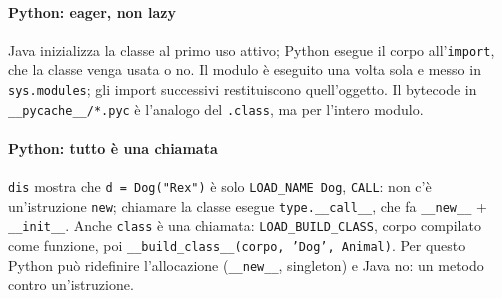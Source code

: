 \documentclass[a4paper,12pt]{article}
\begin{document}
\paragraph{Python: eager, non lazy} Java inizializza la classe al primo uso attivo; Python
esegue il corpo all'\texttt{import}, che la classe venga usata o no. Il modulo è eseguito una
volta sola e messo in \texttt{sys.modules}; gli import successivi restituiscono quell'oggetto. Il
bytecode in \texttt{\_\_pycache\_\_/*.pyc} è l'analogo del \texttt{.class}, ma per l'intero modulo.

\paragraph{Python: tutto è una chiamata} \texttt{dis} mostra che \texttt{d = Dog("Rex")} è solo
\texttt{LOAD\_NAME Dog}, \texttt{CALL}: non c'è un'istruzione \texttt{new}; chiamare la classe
esegue \texttt{type.\_\_call\_\_}, che fa \texttt{\_\_new\_\_} + \texttt{\_\_init\_\_}. Anche
\texttt{class} è una chiamata: \texttt{LOAD\_BUILD\_CLASS}, corpo compilato come funzione, poi
\texttt{\_\_build\_class\_\_(corpo, 'Dog', Animal)}. Per questo Python può ridefinire l'allocazione
(\texttt{\_\_new\_\_}, singleton) e Java no: un metodo contro un'istruzione.
\end{document}
